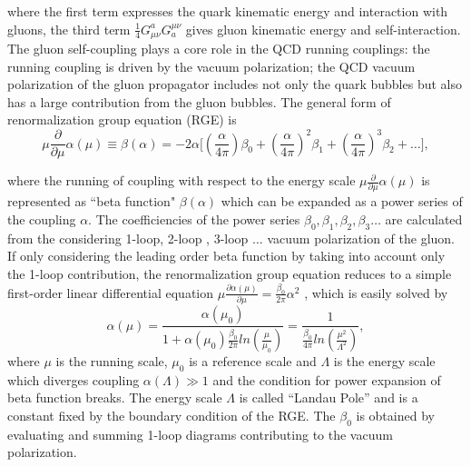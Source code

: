 \noindent where the first term expresses the quark kinematic energy and interaction with gluons, the third term $\frac{1}{4}G^a_{\mu\nu}G^{\mu\nu}_a$  gives gluon kinematic energy and self-interaction. The gluon self-coupling plays a core role in the QCD running couplings: the running coupling is driven by the vacuum polarization; the QCD vacuum polarization of the gluon propagator includes not only the quark bubbles but also has a large contribution from the gluon bubbles. The general form of renormalization group equation (RGE) is
\begin{equation}
	\mu \frac{\partial}{\partial \mu} \alpha(\mu) \equiv \beta(\alpha) = -2\alpha\big [  (\frac{\alpha}{4\pi}) \beta_0 +  (\frac{\alpha}{4\pi}) ^2 \beta_1  +  (\frac{\alpha}{4\pi}) ^3 \beta_2  + \dots \big], 
    \label{eqn:physics:qft:qcd:rge}
\end{equation}

\noindent where the running of coupling with respect to the energy scale $\mu \frac{\partial}{\partial \mu} \alpha(\mu) $ is represented as ``beta function" $\beta(\alpha)$ which can be expanded as a power series of the coupling $\alpha$. The coefficiencies of the power series $\beta_0, \beta_1 ,\beta_2  ,\beta_3 \dots $ are calculated from the considering 1-loop, 2-loop , 3-loop $\dots$ vacuum polarization of the gluon. If only considering the leading order beta function by taking into account only the 1-loop contribution, the renormalization group equation reduces to a simple first-order linear differential equation $\mu \frac{\partial \alpha(\mu) }{\partial \mu} = \frac{\beta_0}{2\pi} \alpha^2$ , which is easily solved by
\begin{equation}
	\alpha(\mu) = \frac{\alpha(\mu_0) }{1+\alpha(\mu_0) \frac{\beta_0}{2\pi}  ln(\frac{\mu}{\mu_0})}=\frac{1}{\frac{\beta_0}{4\pi}  ln(\frac{\mu^2}{\Lambda^2})},
    \label{eqn:physics:qft:qcd:zeroOrderRunning}
\end{equation}
\noindent where $\mu$ is the running scale, $\mu_0$ is a reference scale and $\Lambda$  is the energy scale which diverges coupling $\alpha(\Lambda) \gg 1$ and the condition for power expansion of beta function breaks. The energy scale $\Lambda$  is called ``Landau Pole'' and is a constant fixed by the boundary condition of the RGE. The $\beta_0$ is obtained by evaluating and summing 1-loop diagrams contributing to the vacuum polarization. 

